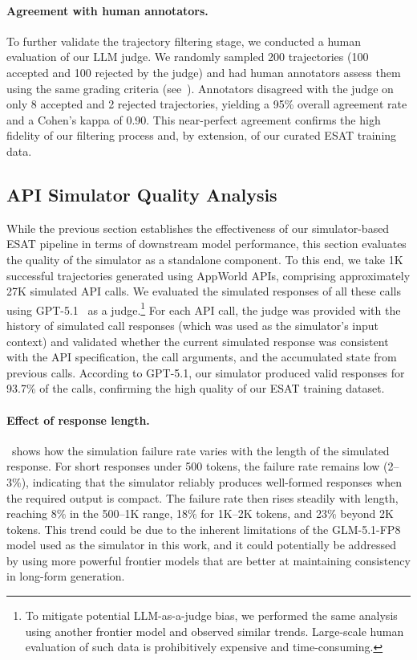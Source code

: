 

\paragraph{Agreement with human annotators.} To further validate the trajectory filtering stage, we conducted a human evaluation of our LLM judge. We randomly sampled 200 trajectories (100 accepted and 100 rejected by the judge) and had human annotators assess them using the same grading criteria (see~). Annotators disagreed with the judge on only 8 accepted and 2 rejected trajectories, yielding a 95\% overall agreement rate and a Cohen's kappa of 0.90. This near-perfect agreement confirms the high fidelity of our filtering process and, by extension, of our curated \textsc{ESAT} training data.




\subsection{API Simulator Quality Analysis}
\label{sec:simulator_quality}
While the previous section establishes the effectiveness of our simulator-based \textsc{ESAT} pipeline in terms of downstream model performance, this section evaluates the quality of the simulator as a standalone component. To this end, we take 1K successful trajectories generated using AppWorld APIs, comprising approximately 27K simulated API calls. We evaluated the simulated responses of all these calls using GPT-5.1~\citep{openai2025gpt51} as a judge.\footnote{To mitigate potential LLM-as-a-judge bias, we performed the same analysis using another frontier model and observed similar trends. Large-scale human evaluation of such data is prohibitively expensive and time-consuming.} For each API call, the judge was provided with the history of simulated call responses (which was used as the simulator's input context) and validated whether the current simulated response was consistent with the API specification, the call arguments, and the accumulated state from previous calls. According to GPT-5.1, our simulator produced valid responses for 93.7\% of the calls, confirming the high quality of our \textsc{ESAT} training dataset.


\paragraph{Effect of response length.}  \ shows how the simulation failure rate varies with the length of the simulated response. For short responses under 500 tokens, the failure rate remains low (2–3\%), indicating that the simulator reliably produces well-formed responses when the required output is compact. The failure rate then rises steadily with length, reaching 8\% in the 500–1K range, 18\% for 1K–2K tokens, and 23\% beyond 2K tokens. This trend could be due to the inherent limitations of the GLM-5.1-FP8 model used as the simulator in this work, and it could potentially be addressed by using more powerful frontier models that are better at maintaining consistency in long-form generation.

